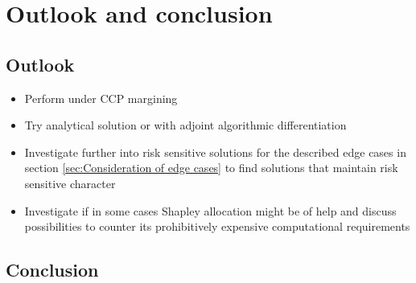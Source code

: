 \documentclass[../Thesis_AHoecherl.tex]{subfiles}
\begin{document}
    \chapter{Outlook and conclusion}\label{sec:Outlook and Conclusion}
    \section{Outlook\label{sec:Outlook}}
    \begin{itemize}
        \item Perform under CCP margining
        \item Try analytical solution or with adjoint algorithmic differentiation
        \item Investigate further into risk sensitive solutions for the described edge cases in section \ref{sec:Consideration of edge cases} to find solutions that maintain risk sensitive character
        \item Investigate if in some cases Shapley allocation might be of help and discuss possibilities to counter its prohibitively expensive computational requirements
    \end{itemize}
    \section{Conclusion}\label{Conclusion}
\end{document}
